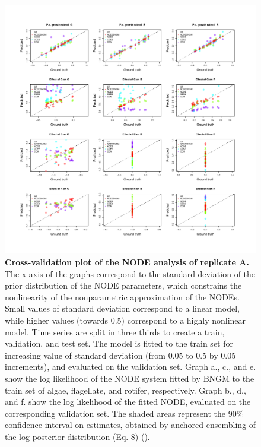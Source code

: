 \documentclass[11pt, oneside]{article}
\begin{document}
\newpage
\begin{figure}[H]
\includegraphics[width=1\linewidth,page=7]{figures/figures_supplementary.pdf}
\caption{
    \textbf{Cross-validation plot of the NODE analysis of replicate A.}
    The x-axis of the graphs correspond to the standard deviation of the prior distribution of the NODE parameters, which constrains the nonlinearity of the nonparametric approximation of the NODEs.
    Small values of standard deviation correspond to a linear model, while higher values (towards 0.5) correspond to a highly nonlinear model.
    Time series are split in three thirds to create a train, validation, and test set. 
    The model is fitted to the train set for increasing value of standard deviation (from 0.05 to 0.5 by 0.05 increments), and evaluated on the validation set.
    Graph a., c., and e. show the log likelihood of the NODE system fitted by BNGM to the train set of algae, flagellate, and rotifer, respectively.
    Graph b., d., and f. show the log likelihood of the fitted NODE, evaluated on the corresponding validation set.
    The shaded areas represent the 90\% confidence interval on estimates, obtained by anchored ensembling of the log posterior distribution (Eq. 8) (\cite{Pearce2018}).
}
\end{figure}
\newpage
\end{document}
